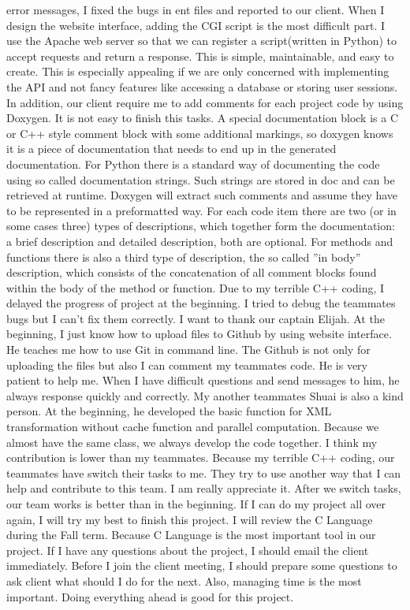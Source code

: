error messages, I fixed the bugs in ent files and reported to our client. When I design the website interface, adding the CGI script is the most difficult part. I use the Apache web server so that we can register a script(written in Python) to accept requests and return a response. This is simple, maintainable, and easy to create. This is especially appealing if we are only concerned with implementing the API and not fancy features like accessing a database or storing user sessions. In addition, our client require me to add comments for each project code by using Doxygen. It is not easy to finish this tasks. A special documentation block is a C or C++ style comment block with some additional markings, so doxygen knows it is a piece of documentation that needs to end up in the generated documentation. For Python there is a standard way of documenting the code using so called documentation strings. Such strings are stored in doc and can be retrieved at runtime. Doxygen will extract such comments and assume they have to be represented in a preformatted way. For each code item there are two (or in some cases three) types of descriptions, which together form the documentation: a brief description and detailed description, both are optional. For methods and functions there is also a third type of description, the so called ”in body” description, which consists of the concatenation of all comment blocks found within the body of the method or function. Due to my terrible C++ coding, I delayed the progress of project at the beginning. I tried to debug the teammates bugs but I can’t fix them correctly. I want to thank our captain Elijah. At the beginning, I just know how to upload files to Github by using website interface. He teaches me how to use Git in command line. The Github is not only for uploading the files but also I can comment my teammates code. He is very patient to help me. When I have difficult questions and send messages to him, he always response quickly and correctly. My another teammates Shuai is also a kind person. At the beginning, he developed the basic function for XML transformation without cache function and parallel computation. Because we almost have the same class, we always develop the code together. I think my contribution is lower than my teammates. Because my terrible C++ coding, our teammates have switch their tasks to me. They try to use another way that I can help and contribute to this team. I am really appreciate it. After we switch tasks, our team works is better than in the beginning. If I can do my project all over again, I will try my best to finish this project. I will review the C Language during the Fall term. Because C Language is the most important tool in our project. If I have any questions about the project, I should email the client immediately. Before I join the client meeting, I should prepare some questions to ask client what should I do for the next. Also, managing time is the most important. Doing everything ahead is good for this project.  
